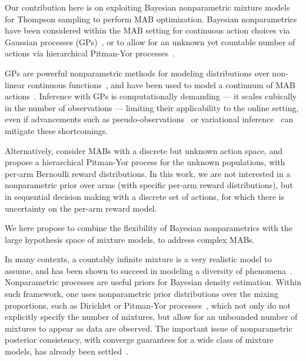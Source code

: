 \documentclass{article}
\begin{document}
Our contribution here is on exploiting Bayesian nonparametric mixture models for Thompson sampling to perform MAB optimization. Bayesian nonparametrics~\cite{j-Gershman2012} have been considered within the MAB setting for continuous action choices via Gaussian processes (GPs)~\cite{ip-Srinivas2010,ip-Gruenewaelder2010,ic-Krause2011}, or to allow for an unknown yet countable number of actions via hierarchical Pitman-Yor processes~\cite{j-Battiston2018}.

GPs are powerful nonparametric methods for modeling distributions over non-linear continuous functions~\cite{b-Rasmussen2005}, and have been used to model a continuum of MAB actions~\cite{ic-Krause2011}. Inference with GPs is computationally demanding --- it scales cubically in the number of observations --- limiting their applicability to the online setting, even if advancements such as pseudo-observations~\cite{ic-Snelson2006} or variational inference~\cite{ip-Titsias2009} can mitigate these shortcomings. 

Alternatively, \citet{j-Battiston2018} consider MABs with a discrete but unknown action space, and propose a hierarchical Pitman-Yor process for the unknown populations, with per-arm Bernoulli reward distributions. In this work, we are not interested in a nonparametric prior over arms (with specific per-arm reward distributions), but in sequential decision making with a discrete set of actions, for which there is uncertainty on the per-arm reward model.

We here propose to combine the flexibility of Bayesian nonparametrics with the large hypothesis space of mixture models, to address complex MABs.

In many contexts, a countably infinite mixture is a very realistic model to assume, and has been shown to succeed in modeling a diversity of phenomena~\cite{j-Gershman2012}. Nonparametric processes are useful priors for Bayesian density estimation. Within such framework, one uses nonparametric prior distributions over the mixing proportions, such as Dirichlet or Pitman-Yor processes~\cite{j-Teh2010}, which not only do not explicitly specify the number of mixtures, but allow for an unbounded number of mixtures to appear as data are observed. The important issue of nonparametric posterior consistency, with converge guarantees for a wide class of mixture models, has already been settled~\cite{j-Ghosal1999, j-Ghosal2001, j-Lijoi2004, j-Ghosal2007}.
\end{document}
